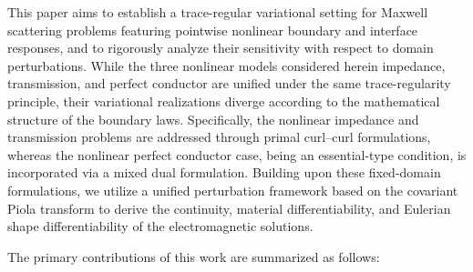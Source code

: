 \documentclass[12pt,reqno]{amsart}
\theoremstyle{definition}
\numberwithin{equation}{section}
\begin{document}
This paper aims to establish a trace-regular variational setting for Maxwell scattering problems featuring pointwise nonlinear boundary and interface responses, and to rigorously analyze their sensitivity with respect to domain perturbations. While the three nonlinear models considered herein impedance, transmission, and perfect conductor are unified under the same trace-regularity principle, their variational realizations diverge according to the mathematical structure of the boundary laws. Specifically, the nonlinear impedance and transmission problems are addressed through primal curl--curl formulations, whereas the nonlinear perfect conductor case, being an essential-type condition, is incorporated via a mixed dual formulation. Building upon these fixed-domain formulations, we utilize a unified perturbation framework based on the covariant Piola transform to derive the continuity, material differentiability, and Eulerian shape differentiability of the electromagnetic solutions.

The primary contributions of this work are summarized as follows:
\end{document}
